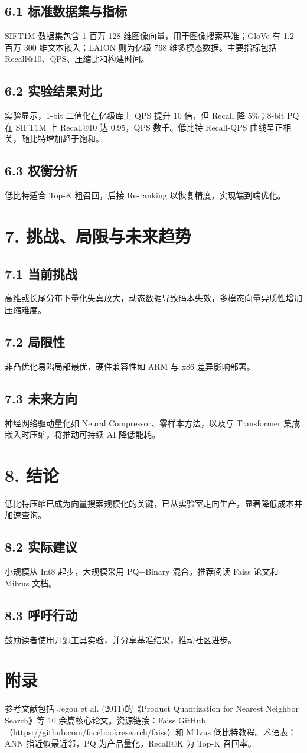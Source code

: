 \section{6.1 标准数据集与指标}
SIFT1M 数据集包含 1 百万 128 维图像向量，用于图像搜索基准；GloVe 有 1.2 百万 300 维文本嵌入；LAION 则为亿级 768 维多模态数据。主要指标包括 Recall@10、QPS、压缩比和构建时间。\par
\section{6.2 实验结果对比}
实验显示，1-bit 二值化在亿级库上 QPS 提升 10 倍，但 Recall 降 5\%{}；8-bit PQ 在 SIFT1M 上 Recall@10 达 0.95，QPS 数千。低比特 Recall-QPS 曲线呈正相关，随比特增加趋于饱和。\par
\section{6.3 权衡分析}
低比特适合 Top-K 粗召回，后接 Re-ranking 以恢复精度，实现端到端优化。\par
\chapter{7. 挑战、局限与未来趋势}
\section{7.1 当前挑战}
高维或长尾分布下量化失真放大，动态数据导致码本失效，多模态向量异质性增加压缩难度。\par
\section{7.2 局限性}
非凸优化易陷局部最优，硬件兼容性如 ARM 与 x86 差异影响部署。\par
\section{7.3 未来方向}
神经网络驱动量化如 Neural Compressor、零样本方法，以及与 Transformer 集成嵌入时压缩，将推动可持续 AI 降低能耗。\par
\chapter{8. 结论}
低比特压缩已成为向量搜索规模化的关键，已从实验室走向生产，显著降低成本并加速查询。\par
\section{8.2 实际建议}
小规模从 Int8 起步，大规模采用 PQ+Binary 混合。推荐阅读 Faiss 论文和 Milvus 文档。\par
\section{8.3 呼吁行动}
鼓励读者使用开源工具实验，并分享基准结果，推动社区进步。\par
\chapter{附录}
参考文献包括 Jegou et al. (2011)的《Product Quantization for Nearest Neighbor Search》等 10 余篇核心论文。资源链接：Faiss GitHub（https://github.com/facebookresearch/faiss）和 Milvus 低比特教程。术语表：ANN 指近似最近邻，PQ 为产品量化，Recall@K 为 Top-K 召回率。\par
